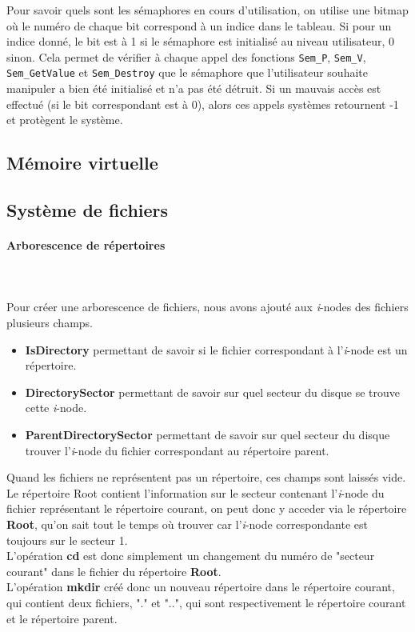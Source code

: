 \documentclass{report}
\newcommand{\myparagraph}[1]{\paragraph*{#1}\mbox{}\\}
\begin{document}
Pour savoir quels sont les sémaphores en cours d'utilisation, on utilise une bitmap où le numéro de chaque bit correspond à un indice dans le tableau. Si pour un indice donné, le bit est à 1 si le sémaphore est initialisé au niveau utilisateur, 0 sinon. Cela permet de vérifier à chaque appel des fonctions \texttt{Sem\_P}, \texttt{Sem\_V}, \texttt{Sem\_GetValue} et \texttt{Sem\_Destroy} que le sémaphore que l'utilisateur souhaite manipuler a bien été initialisé et n'a pas été détruit. Si un mauvais accès est effectué (si le bit correspondant est à 0), alors ces appels systèmes retournent -1 et protègent le système.
 
\subsection*{Mémoire virtuelle}

\subsection*{Système de fichiers}
\myparagraph{Arborescence de répertoires}\\
	
Pour créer une arborescence de fichiers, nous avons ajouté aux \textit{i}-nodes des fichiers plusieurs champs.
\begin{itemize}
\item \textbf{IsDirectory} permettant de savoir si le fichier correspondant à l'\textit{i}-node est un répertoire.
\item \textbf{DirectorySector} permettant de savoir sur quel secteur du disque se trouve cette \textit{i}-node.
\item \textbf{ParentDirectorySector} permettant de savoir sur quel secteur du disque trouver l'\textit{i}-node du fichier correspondant au répertoire parent.
\end{itemize}
Quand les fichiers ne représentent pas un répertoire, ces champs sont laissés vide. \\
Le répertoire Root contient l'information sur le secteur contenant l'\textit{i}-node du fichier représentant le répertoire courant, on peut donc y acceder via le répertoire \textbf{Root}, qu'on sait tout le temps où trouver car l'\textit{i}-node correspondante est toujours sur le secteur 1.	\\	
L'opération \textbf{cd} est donc simplement un changement du numéro de "secteur courant" dans le fichier du répertoire \textbf{Root}.  \\
L'opération \textbf{mkdir} créé donc un nouveau répertoire dans le répertoire courant, qui contient deux fichiers, "." et "..", qui sont respectivement le répertoire courant et le répertoire parent.
	
\end{document}

